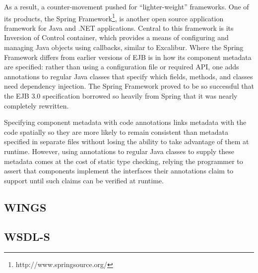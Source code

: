 \documentclass{article}
\begin{document}
As a result, a counter-movement pushed for ``lighter-weight'' frameworks.
One of its products, the Spring
Framework\footnote{http://www.springsource.org/}, is another open source
application framework for Java and .NET applications.  Central to
this framework is its Inversion of Control container, which provides
a means of configuring and managing Java objects using callbacks,
similar to Excalibur.  Where the Spring Framework differs from earlier
versions of EJB is in how its component metadata are specified: rather
than using a configuration file or required API, one adds annotations to
regular Java classes that specify which fields, methods, and classes need
dependency injection.  The Spring Framework proved to be so successful
that the EJB 3.0 specification borrowed so heavily from Spring that it
was nearly completely rewritten.

Specifying component metadata with code annotations links metadata
with the code spatially so they are more likely to remain consistent than
metadata specified in separate files without losing the ability to take
advantage of them at runtime.  However, using annotations to regular
Java classes to supply these metadata comes at the cost of static
type checking, relying the programmer to assert that components
implement the interfaces their annotations claim to support until such
claims can be verified at runtime.


\subsection{WINGS}



\subsection{WSDL-S}
\end{document}

